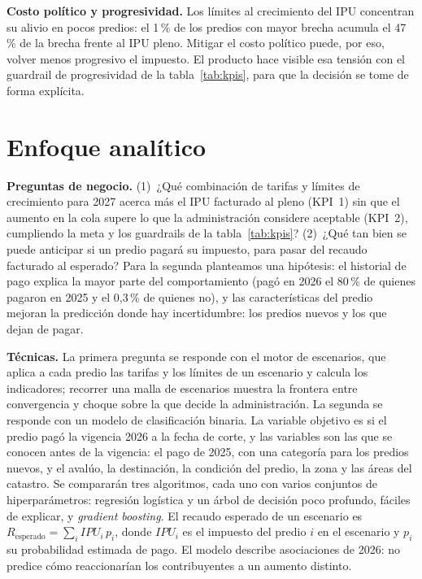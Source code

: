 \documentclass[12pt,letterpaper]{article}
\begin{document}
\textbf{Costo político y progresividad.} Los límites al crecimiento del IPU concentran su alivio en pocos predios: el 1\,\% de los
predios con mayor brecha acumula el 47\,\% de la brecha frente al IPU pleno. Mitigar el costo
político puede, por eso, volver menos progresivo el impuesto. El producto hace visible esa
tensión con el guardrail de progresividad de la tabla~\ref{tab:kpis}, para que la decisión se
tome de forma explícita.

\section{Enfoque analítico} %
\textbf{Preguntas de negocio.} (1)~¿Qué combinación de tarifas y límites de crecimiento para
2027 acerca más el IPU facturado al pleno (KPI~1) sin que el aumento en la cola supere lo que la
administración considere aceptable (KPI~2), cumpliendo la meta y los guardrails de la
tabla~\ref{tab:kpis}? (2)~¿Qué tan bien se puede anticipar si un predio pagará su impuesto, para
pasar del recaudo facturado al esperado? Para la segunda planteamos una hipótesis: el historial
de pago explica la mayor parte del comportamiento (pagó en 2026 el 80\,\% de quienes pagaron en
2025 y el 0,3\,\% de quienes no), y las características del predio mejoran la predicción donde
hay incertidumbre: los predios nuevos y los que dejan de pagar.

\textbf{Técnicas.} La primera pregunta se responde con el motor de escenarios, que aplica a cada
predio las tarifas y los límites de un escenario y calcula los indicadores; recorrer una malla de
escenarios muestra la frontera entre convergencia y choque sobre la que decide la administración.
La segunda se responde con
un modelo de clasificación binaria. La variable objetivo es si el predio pagó la vigencia 2026 a
la fecha de corte, y las variables son las que se conocen antes de la vigencia: el pago de 2025,
con una categoría para los predios nuevos, y el avalúo, la destinación, la condición del predio,
la zona y las áreas del catastro. Se compararán tres algoritmos, cada uno con varios conjuntos de
hiperparámetros: regresión logística y un árbol de decisión poco profundo, fáciles de explicar, y
\textit{gradient boosting}. El recaudo esperado de un escenario es
$R_{\text{esperado}}=\sum_{i} \mathit{IPU}_i\,p_i$, donde $\mathit{IPU}_i$ es el impuesto del
predio $i$ en el escenario y $p_i$ su probabilidad estimada de pago. El modelo describe asociaciones de 2026: no predice cómo reaccionarían los
contribuyentes a un aumento distinto.
\end{document}
